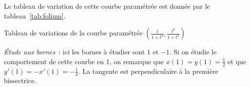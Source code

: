 Le tableau de variation de cette courbe paramétrée est donnée par le tableau~\ref{tab:folium}.

\begin{table}
\centering
\caption{Tableau de variations de la courbe paramétrée $\left(\frac{t}{1+t^3},\frac{t^2}{1+t^3}\right)$}
\label{tab:folium}
\end{table}

\emph{Étude aux bornes}~:
ici les bornes à étudier sont $1$ et $-1$. Si on étudie le comportement de cette courbe en 1, on remarque que $x(1)=y(1)=\frac{1}{2}$ et que $y'(1)=-x'(1)=-\frac{1}{4}$. La tangente est perpendiculaire à la première bissectrice.

